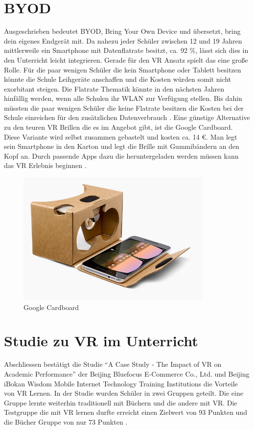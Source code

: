 \section{BYOD}
Ausgeschrieben bedeutet BYOD, Bring Your Own Device und übersetzt, bring dein eigenes Endgerät mit. Da nahezu jeder Schüler zwischen 12 und 19 Jahren mittlerweile ein Smartphone mit Datenflatrate besitzt, ca. 92 \%, lässt sich dies in den Unterricht leicht integrieren. Gerade für den VR Ansatz spielt das eine große Rolle. Für die paar wenigen Schüler die kein Smartphone oder Tablett besitzen könnte die Schule Leihgeräte anschaffen und die Kosten würden somit nicht exorbitant steigen. Die Flatrate Thematik könnte in den nächsten Jahren hinfällig werden, wenn alle Schulen ihr WLAN zur Verfügung stellen. Bis dahin müssten die paar wenigen Schüler die keine Flatrate besitzen die Kosten bei der Schule einreichen für den zusätzlichen Datenverbrauch \cite[vgl.][]{Cardboard1}. 
Eine günstige Alternative zu den teuren VR Brillen die es im Angebot gibt, ist die Google Cardboard. Diese Variante wird selbst zusammen gebastelt und kosten ca. 14 \euro{}. Man legt sein Smartphone in den Karton und legt die Brille mit Gummibändern an den Kopf an. Durch passende Apps dazu die heruntergeladen werden müssen kann das VR Erlebnis beginnen \cite[vgl.][]{Cardboard2}.

\begin{figure}[ht]
	\centering
	\includegraphics[width=\textwidth,height=\textheight,keepaspectratio]{images/Google Carboard.png}
	\caption{Google Cardboard}
	\label{Google Cardboard}
\end{figure}

\section{Studie zu VR im Unterricht}
Abschliessen bestätigt die Studie “A Case Study - The Impact of VR on Academic Performance” der Beijing Bluefocus E-Commerce Co., Ltd. und Beijing iBokan Wisdom Mobile Internet Technology Training Institutions die Vorteile von VR Lernen. In der Studie wurden Schüler in zwei Gruppen geteilt. Die eine Gruppe lernte weiterhin traditionell mit Büchern und die andere mit VR. Die Testgruppe die mit VR lernen durfte erreicht einen Zielwert von 93 Punkten und die Bücher Gruppe von nur 73 Punkten  \cite[vgl.][]{htcvive}.

